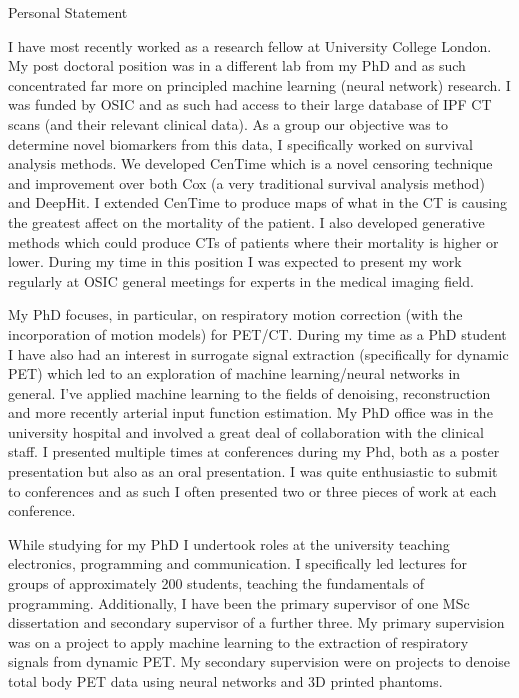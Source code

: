\documentclass{cv}
\begin{document}
    \begin{rSection}{Personal Statement}
        \item I have most recently worked as a research fellow at University College London. My post doctoral position was in a different lab from my PhD and as such concentrated far more on principled machine learning (neural network) research. I was funded by OSIC and as such had access to their large database of IPF CT scans (and their relevant clinical data). As a group our objective was to determine novel biomarkers from this data, I specifically worked on survival analysis methods. We developed CenTime which is a novel censoring technique and improvement over both Cox (a very traditional survival analysis method) and DeepHit. I extended CenTime to produce maps of what in the CT is causing the greatest affect on the mortality of the patient. I also developed generative methods which could produce CTs of patients where their mortality is higher or lower. During my time in this position I was expected to present my work regularly at OSIC general meetings for experts in the medical imaging field.
        
        \item My PhD focuses, in particular, on respiratory motion correction (with the incorporation of motion models) for PET/CT. During my time as a PhD student I have also had an interest in surrogate signal extraction (specifically for dynamic PET) which led to an exploration of machine learning/neural networks in general. I've applied machine learning to the fields of denoising, reconstruction and more recently arterial input function estimation. My PhD office was in the university hospital and involved a great deal of collaboration with the clinical staff. I presented multiple times at conferences during my Phd, both as a poster presentation but also as an oral presentation. I was quite enthusiastic to submit to conferences and as such I often presented two or three pieces of work at each conference.
        
        \item While studying for my PhD I undertook roles at the university teaching electronics, programming and communication. I specifically led lectures for groups of approximately 200 students, teaching the fundamentals of programming. Additionally, I have been the primary supervisor of one MSc dissertation and secondary supervisor of a further three. My primary supervision was on a project to apply machine learning to the extraction of respiratory signals from dynamic PET. My secondary supervision were on projects to denoise total body PET data using neural networks and 3D printed phantoms.
        

\end{rSection}
\end{document}
